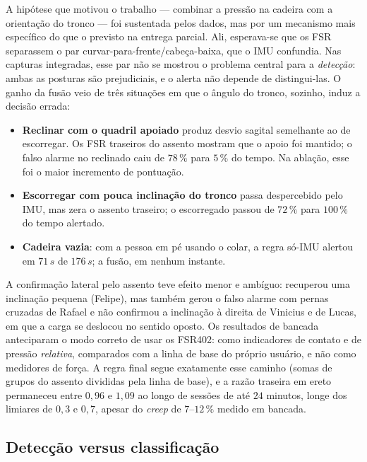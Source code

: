 A hipótese que motivou o trabalho --- combinar a pressão na cadeira com a
orientação do tronco --- foi sustentada pelos dados, mas por um mecanismo
mais específico do que o previsto na entrega parcial. Ali, esperava-se que os
FSR separassem o par curvar-para-frente/cabeça-baixa, que o IMU confundia.
Nas capturas integradas, esse par não se mostrou o problema central para a
\emph{detecção}: ambas as posturas são prejudiciais, e o alerta não depende de
distingui-las. O ganho da fusão veio de três situações em que o ângulo do
tronco, sozinho, induz a decisão errada:
\begin{itemize}[nosep]
  \item \textbf{Reclinar com o quadril apoiado} produz desvio sagital semelhante
        ao de escorregar. Os FSR traseiros do assento mostram que o apoio foi
        mantido; o falso alarme no reclinado caiu de $78\,\%$ para $5\,\%$ do
        tempo. Na ablação, esse foi o maior incremento de pontuação.
  \item \textbf{Escorregar com pouca inclinação do tronco} passa despercebido
        pelo IMU, mas zera o assento traseiro; o escorregado passou de $72\,\%$
        para $100\,\%$ do tempo alertado.
  \item \textbf{Cadeira vazia}: com a pessoa em pé usando o colar, a regra
        só-IMU alertou em $71\,s$ de $176\,s$; a fusão, em nenhum instante.
\end{itemize}

A confirmação lateral pelo assento teve efeito menor e ambíguo: recuperou uma
inclinação pequena (Felipe), mas também gerou o falso alarme com pernas
cruzadas de Rafael e não confirmou a inclinação à direita de Vinicius e de
Lucas, em que a carga se deslocou no sentido oposto. Os resultados de bancada
anteciparam o modo correto de usar os FSR402: como indicadores de contato e
de pressão \emph{relativa}, comparados com a linha de base do próprio usuário,
e não como medidores de força. A regra final segue exatamente esse caminho
(somas de grupos do assento divididas pela linha de base), e a razão traseira
em ereto permaneceu entre $0{,}96$ e $1{,}09$ ao longo de sessões de até
$24$ minutos, longe dos limiares de $0{,}3$ e $0{,}7$, apesar do
\textit{creep} de $7$--$12\,\%$ medido em bancada.

\subsection{Detecção versus classificação}
\label{sec:dis-deteccao}

